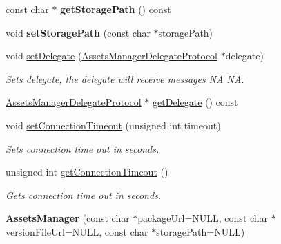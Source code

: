 \begin{DoxyCompactItemize}
\item 
\mbox{\label{classAssetsManager_ac95ca34f1e5de01687fc06ccb17b2948}} 
const char $\ast$ {\bfseries get\+Storage\+Path} () const
\item 
\mbox{\label{classAssetsManager_ab4f07674f77335d2011b6d20cf2f10cf}} 
void {\bfseries set\+Storage\+Path} (const char $\ast$storage\+Path)
\item 
\mbox{\label{classAssetsManager_a3a146a72ce6e481f8833cce8e007b881}} 
void \hyperlink{classAssetsManager_a3a146a72ce6e481f8833cce8e007b881}{set\+Delegate} (\hyperlink{classAssetsManagerDelegateProtocol}{Assets\+Manager\+Delegate\+Protocol} $\ast$delegate)
\begin{DoxyCompactList}\small\item\em Sets delegate, the delegate will receive messages  NA  NA. \end{DoxyCompactList}\item 
\hyperlink{classAssetsManagerDelegateProtocol}{Assets\+Manager\+Delegate\+Protocol} $\ast$ \hyperlink{classAssetsManager_a297c23ec228e1885904f9ab9864a4d65}{get\+Delegate} () const
\item 
\mbox{\label{classAssetsManager_a577f7023974b3ff2ba8331311354688b}} 
void \hyperlink{classAssetsManager_a577f7023974b3ff2ba8331311354688b}{set\+Connection\+Timeout} (unsigned int timeout)
\begin{DoxyCompactList}\small\item\em Sets connection time out in seconds. \end{DoxyCompactList}\item 
\mbox{\label{classAssetsManager_a7507fe3047a85bd861c02b95f54c1dd2}} 
unsigned int \hyperlink{classAssetsManager_a7507fe3047a85bd861c02b95f54c1dd2}{get\+Connection\+Timeout} ()
\begin{DoxyCompactList}\small\item\em Gets connection time out in seconds. \end{DoxyCompactList}\item 
\mbox{\label{classAssetsManager_a9104b270065e041b92c404bca70f80d9}} 
{\bfseries Assets\+Manager} (const char $\ast$package\+Url=N\+U\+LL, const char $\ast$version\+File\+Url=N\+U\+LL, const char $\ast$storage\+Path=N\+U\+LL)

\end{DoxyCompactItemize}
